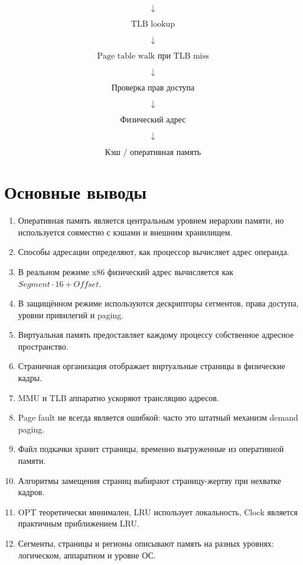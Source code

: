 \documentclass[a4paper,12pt]{article}
\begin{document}
\[
\downarrow
\]

\[
\boxed{
\text{TLB lookup}
}
\]

\[
\downarrow
\]

\[
\boxed{
\text{Page table walk при TLB miss}
}
\]

\[
\downarrow
\]

\[
\boxed{
\text{Проверка прав доступа}
}
\]

\[
\downarrow
\]

\[
\boxed{
\text{Физический адрес}
}
\]

\[
\downarrow
\]

\[
\boxed{
\text{Кэш / оперативная память}
}
\]

\section{Основные выводы}

\begin{enumerate}
    \item Оперативная память является центральным уровнем иерархии памяти, но используется совместно с кэшами и внешним хранилищем.
    \item Способы адресации определяют, как процессор вычисляет адрес операнда.
    \item В реальном режиме x86 физический адрес вычисляется как $Segment \cdot 16 + Offset$.
    \item В защищённом режиме используются дескрипторы сегментов, права доступа, уровни привилегий и paging.
    \item Виртуальная память предоставляет каждому процессу собственное адресное пространство.
    \item Страничная организация отображает виртуальные страницы в физические кадры.
    \item MMU и TLB аппаратно ускоряют трансляцию адресов.
    \item Page fault не всегда является ошибкой: часто это штатный механизм demand paging.
    \item Файл подкачки хранит страницы, временно выгруженные из оперативной памяти.
    \item Алгоритмы замещения страниц выбирают страницу-жертву при нехватке кадров.
    \item OPT теоретически минимален, LRU использует локальность, Clock является практичным приближением LRU.
    \item Сегменты, страницы и регионы описывают память на разных уровнях: логическом, аппаратном и уровне ОС.
\end{enumerate}
\end{document}
